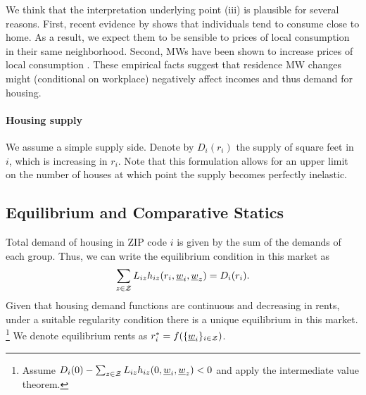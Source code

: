 We think that the interpretation underlying point (iii) is plausible for several 
reasons.
First, recent evidence by \textcite{MiyauchiEtAl2021} shows that individuals tend 
to consume close to home.
As a result, we expect them to be sensible to prices of local consumption in their 
same neighborhood.
Second, MWs have been shown to increase prices of local consumption 
\parencite[e.g.,][]{AllegrettoReich2018, LeungForthcoming}.
These empirical facts suggest that residence MW changes might (conditional on workplace)
negatively affect incomes and thus demand for housing.

\paragraph{Housing supply}

We assume a simple supply side. Denote by $D_i(r_i)$ the supply of square feet in 
$i$, which is increasing in $r_i$.
Note that this formulation allows for an upper limit on the number of houses at 
which point the supply becomes perfectly inelastic.

\subsection{Equilibrium and Comparative Statics}

Total demand of housing in ZIP code $i$ is given by the sum of the demands of each group. 
Thus, we can write the equilibrium condition in this market as
\begin{equation}\label{eq:equilibrium}
	\sum_{z\in\mathcal{Z}} L_{iz} h_{iz} (r_i, \underline{w}_i, \underline{w}_z) = D_i(r_i) .
\end{equation}
Given that housing demand functions are continuous and decreasing in rents, 
under a suitable regularity condition there is a unique equilibrium in this market.%
\footnote{Assume $D_i(0) - \sum_{z\in\mathcal{Z}} L_{iz} h_{iz} (0, \underline{w}_i, \underline{w}_z) < 0$
and apply the intermediate value theorem.}
We denote equilibrium rents as $r^*_i = f(\{\underline{w}_i\}_{i\in\mathcal{Z}})$.


